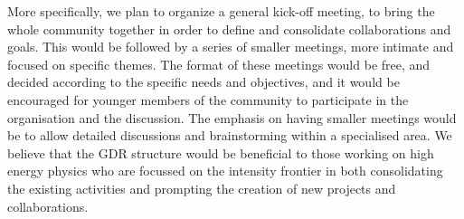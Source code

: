 More specifically, we plan to organize a general kick-off meeting, to bring the whole community together in order to define and consolidate collaborations and goals.
\!
This would be followed by a series of smaller meetings, more intimate and focused on specific themes. The format of these meetings would be free, and decided according to the specific needs and objectives, and it would be encouraged for younger members of the community to participate in the organisation and the discussion.
\!
The emphasis on having smaller meetings would be to allow detailed discussions and brainstorming within a specialised area.
\!
We believe that the GDR structure would be beneficial to those working on high energy physics who are focussed on the intensity frontier in both consolidating the existing activities and prompting the creation of new projects and collaborations.